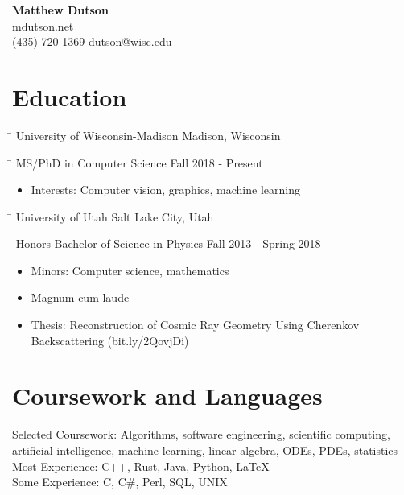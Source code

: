 \documentclass[12pt]{article}
\newcommand{\setfont}{\fontfamily{qag} \selectfont}
\newcommand{\tabsize}{\hspace{4.8in}}
\newenvironment{tab1}
    {\bfseries \begin{tabbing} \tabsize \= \kill}
    {\end{tabbing}}
\newenvironment{tab2}
    {\begin{tabbing} \tabsize \= \kill}
    {\end{tabbing}}
\begin{document}
\setfont
\pagestyle{empty}


\begin{center}
    {\LARGE \bfseries Matthew Dutson}\\
    \medskip
    mdutson.net\\
    (435) 720-1369 \enspace dutson@wisc.edu
\end{center}


\section*{Education}

\begin{tab1} University of Wisconsin-Madison \> Madison, Wisconsin \end{tab1}
\begin{tab2} MS/PhD in Computer Science \> Fall 2018 - Present \end{tab2}

\begin{itemize}
    \item Interests: Computer vision, graphics, machine learning
\end{itemize}

\bigskip

\begin{tab1} University of Utah \> Salt Lake City, Utah \end{tab1}
\begin{tab2} Honors Bachelor of Science in Physics \> Fall 2013 - Spring 2018 \end{tab2}

\begin{itemize}
    \item Minors: Computer science, mathematics
    \item Magnum cum laude
    \item Thesis: Reconstruction of Cosmic Ray Geometry Using Cherenkov Backscattering (bit.ly/2QovjDi)
\end{itemize}


\section*{Coursework and Languages}

Selected Coursework: Algorithms, software engineering, scientific computing, artificial intelligence, machine learning, linear algebra, ODEs, PDEs, statistics\\
Most Experience: C++, Rust, Java, Python, LaTeX\\
Some Experience: C, C\#, Perl, SQL, UNIX
\end{document}
